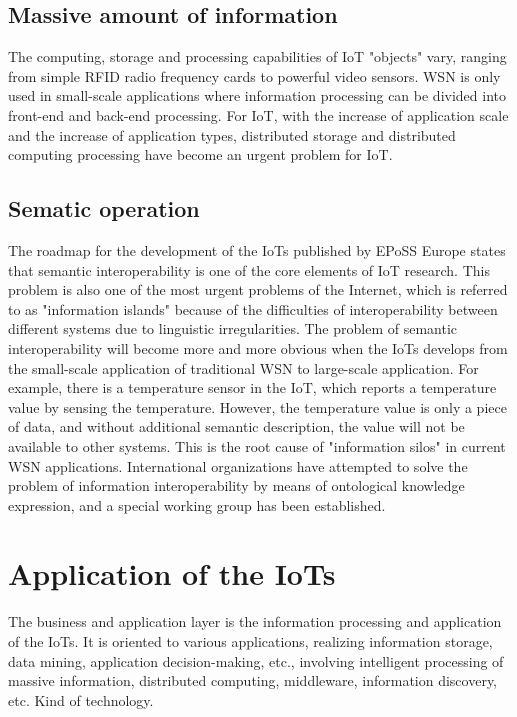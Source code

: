 \documentclass[a4paper,11pt]{article}
\begin{document}
\subsection{Massive amount of information}
The computing, storage and processing capabilities of IoT "objects" vary, ranging from simple RFID radio frequency cards to powerful video sensors. WSN is only used in small-scale applications where information processing can be divided into front-end and back-end processing. For IoT, with the increase of application scale and the increase of application types, distributed storage and distributed computing processing have become an urgent problem for IoT.

\subsection{Sematic operation}
The roadmap for the development of the IoTs published by EPoSS Europe states that semantic interoperability is one of the core elements of IoT research. This problem is also one of the most urgent problems of the Internet, which is referred to as "information islands" because of the difficulties of interoperability between different systems due to linguistic irregularities. The problem of semantic interoperability will become more and more obvious when the IoTs develops from the small-scale application of traditional WSN to large-scale application. For example, there is a temperature sensor in the IoT, which reports a temperature value by sensing the temperature. However, the temperature value is only a piece of data, and without additional semantic description, the value will not be available to other systems. This is the root cause of "information silos" in current WSN applications. International organizations have attempted to solve the problem of information interoperability by means of ontological knowledge expression, and a special working group has been established.



\section{Application of the IoTs}
The business and application layer is the information processing and application of the IoTs. It is oriented to various applications, realizing information storage, data mining, application decision-making, etc., involving intelligent processing of massive information, distributed computing, middleware, information discovery, etc. Kind of technology.
\end{document}
